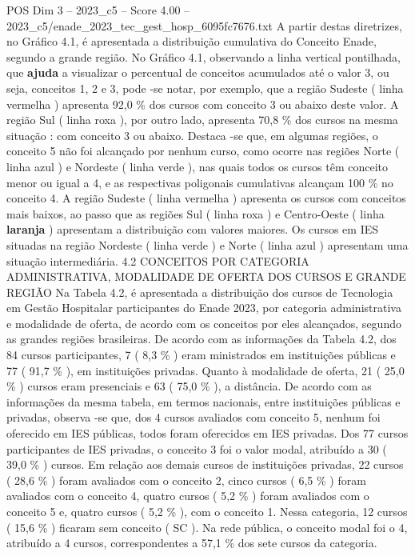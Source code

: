 \begin{textsample}{POS Dim 3 – 2023\_c5 – Score 4.00 – 2023\_c5/enade\_2023\_tec\_gest\_hosp\_6095fc7676.txt}
A partir destas diretrizes, no Gráfico 4.1, é apresentada a distribuição cumulativa do Conceito Enade, segundo a grande região.
No Gráfico 4.1, observando a linha vertical pontilhada, que \textbf{ajuda} a visualizar o percentual de conceitos acumulados até o valor 3, ou seja, conceitos 1, 2 e 3, pode -se notar, por exemplo, que a região Sudeste ( linha vermelha ) apresenta 92,0 \% dos cursos com conceito 3 ou abaixo deste valor.
A região Sul ( linha roxa ), por outro lado, apresenta 70,8 \% dos cursos na mesma situação : com conceito 3 ou abaixo.
Destaca -se que, em algumas regiões, o conceito 5 não foi alcançado por nenhum curso, como ocorre nas regiões Norte ( linha azul ) e Nordeste ( linha verde ), nas quais todos os cursos têm conceito menor ou igual a 4, e as respectivas poligonais cumulativas alcançam 100 \% no conceito 4.
A região Sudeste ( linha vermelha ) apresenta os cursos com conceitos mais baixos, ao passo que as regiões Sul ( linha roxa ) e Centro-Oeste ( linha \textbf{laranja} ) apresentam a distribuição com valores maiores.
Os cursos em IES situadas na região Nordeste ( linha verde ) e Norte ( linha azul ) apresentam uma situação intermediária. 4.2 CONCEITOS POR CATEGORIA ADMINISTRATIVA, MODALIDADE DE OFERTA DOS CURSOS E GRANDE REGIÃO Na Tabela 4.2, é apresentada a distribuição dos cursos de Tecnologia em Gestão Hospitalar participantes do Enade 2023, por categoria administrativa e modalidade de oferta, de acordo com os conceitos por eles alcançados, segundo as grandes regiões brasileiras.
De acordo com as informações da Tabela 4.2, dos 84 cursos participantes, 7 ( 8,3 \% ) eram ministrados em instituições públicas e 77 ( 91,7 \% ), em instituições privadas.
Quanto à modalidade de oferta, 21 ( 25,0 \% ) cursos eram presenciais e 63 ( 75,0 \% ), a distância.
De acordo com as informações da mesma tabela, em termos nacionais, entre instituições públicas e privadas, observa -se que, dos 4 cursos avaliados com conceito 5, nenhum foi oferecido em IES públicas, todos foram oferecidos em IES privadas.
Dos 77 cursos participantes de IES privadas, o conceito 3 foi o valor modal, atribuído a 30 ( 39,0 \% ) cursos.
Em relação aos demais cursos de instituições privadas, 22 cursos ( 28,6 \% ) foram avaliados com o conceito 2, cinco cursos ( 6,5 \% ) foram avaliados com o conceito 4, quatro cursos ( 5,2 \% ) foram avaliados com o conceito 5 e, quatro cursos ( 5,2 \% ), com o conceito 1.
Nessa categoria, 12 cursos ( 15,6 \% ) ficaram sem conceito ( SC ).
Na rede pública, o conceito modal foi o 4, atribuído a 4 cursos, correspondentes a 57,1 \% dos sete cursos da categoria.

\end{textsample}
